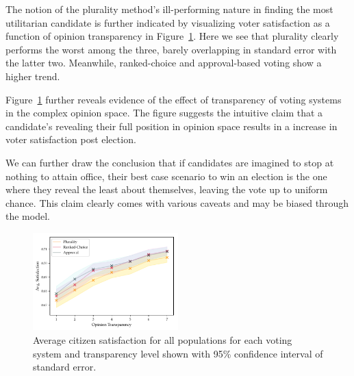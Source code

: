 The notion of the plurality method's ill-performing nature in finding the most utilitarian candidate is further indicated by visualizing voter satisfaction as a function of opinion transparency in Figure~\ref{fig:avghapp_by_transparency}.
Here we see that plurality clearly performs the worst among the three, barely overlapping in standard error with the latter two.
Meanwhile, ranked-choice and approval-based voting show a higher trend.

Figure~\ref{fig:avghapp_by_transparency} further reveals evidence of the effect of transparency of voting systems in the complex opinion space.
The figure suggests the intuitive claim that a candidate's revealing their full position in opinion space results in a increase in voter satisfaction post election.

We can further draw the conclusion that if candidates are imagined to stop at nothing to attain office, their best case scenario to win an election is the one where they reveal the least about themselves, leaving the vote up to uniform chance.
This claim clearly comes with various caveats and may be biased through the model.

\begin{figure}[h!]
\includegraphics[width=0.5\textwidth]{figs/avghapp_transparency.pdf}
\caption{Average citizen satisfaction for all populations for each voting system and transparency level shown
    with 95\% confidence interval of standard error.}
    \label{fig:avghapp_by_transparency}
\end{figure}
